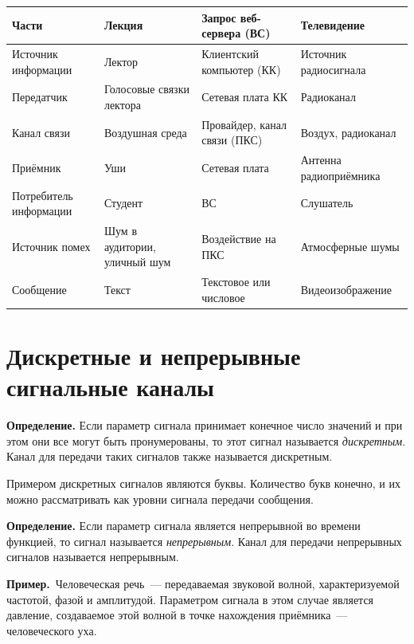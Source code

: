\documentclass[a4paper,11pt]{article}
\newcommand{\prim}{\textbf{Пример.}\ }
\begin{document}
\begin{center}
\small
\begin{tabularx}{\textwidth}{|X|X|X|X|}
\hline
\textbf{Части} & \textbf{Лекция} & \textbf{Запрос веб-сервера (ВС)} & \textbf{Телевидение} \\
\hline
Источник информации & Лектор & Клиентский компьютер (КК) & Источник радиосигнала \\
\hline
Передатчик & Голосовые связки лектора & Сетевая плата КК & Радиоканал \\
\hline
Канал связи & Воздушная среда & Провайдер, канал связи (ПКС) & Воздух, радиоканал \\
\hline
Приёмник & Уши & Сетевая плата & Антенна радиоприёмника \\
\hline
Потребитель информации & Студент & ВС & Слушатель \\
\hline
Источник помех & Шум в аудитории, уличный шум & Воздействие на ПКС & Атмосферные шумы \\
\hline
Сообщение & Текст & Текстовое или числовое & Видеоизображение \\
\hline
\end{tabularx}
\end{center}

\section{Дискретные и непрерывные сигнальные каналы}

\begin{opr}
\textbf{Определение.} Если параметр сигнала принимает конечное число значений и при этом они все
могут быть пронумерованы, то этот сигнал называется \emph{дискретным}.
Канал для передачи таких сигналов также называется дискретным.
\end{opr}

Примером дискретных сигналов являются буквы. Количество букв конечно, и их
можно рассматривать как уровни сигнала передачи сообщения.

\begin{opr}
\textbf{Определение.} Если параметр сигнала является непрерывной во времени функцией, то сигнал
называется \emph{непрерывным}. Канал для передачи непрерывных сигналов называется непрерывным.
\end{opr}

\prim Человеческая речь~--- передаваемая звуковой волной,
характеризуемой частотой, фазой и амплитудой. Параметром сигнала в этом
случае является давление, создаваемое этой волной в точке нахождения
приёмника~--- человеческого уха.
\end{document}
